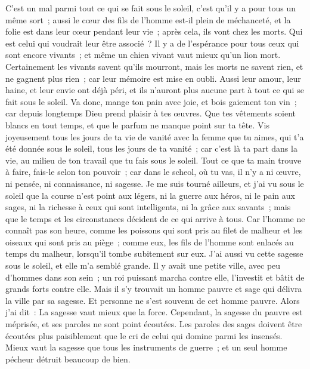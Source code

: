 \begin{multicols}{2}
C'est un mal parmi tout ce qui se fait sous le soleil, c'est qu'il y a pour tous un même sort~; aussi le cœur des fils de l'homme est-il plein de méchanceté, et la folie est dans leur cœur pendant leur vie~; après cela, ils vont chez les morts. Qui est celui qui voudrait leur être associé~?
Il y a de l'espérance pour tous ceux qui sont encore vivants~; et même un chien vivant vaut mieux qu'un lion mort.
Certainement les vivants savent qu'ils mourront, mais les morts ne savent rien, et ne gagnent plus rien~; car leur mémoire est mise en oubli. 
Aussi leur amour, leur haine, et leur envie ont déjà péri, et ils n'auront plus aucune part à tout ce qui se fait sous le soleil.
Va donc, mange ton pain avec joie, et bois gaiement ton vin~; car depuis longtemps Dieu prend plaisir à tes œuvres.
Que tes vêtements soient blancs en tout temps, et que le parfum ne manque point sur ta tête. 
Vis joyeusement tous les jours de ta vie de vanité avec la femme que tu aimes, qui t'a été donnée sous le soleil, tous les jours de ta vanité~; car c'est là ta part dans la vie, au milieu de ton travail que tu fais sous le soleil.
Tout ce que ta main trouve à faire, fais-le selon ton pouvoir~; car dans le scheol, où tu vas, il n'y a ni œuvre, ni pensée, ni connaissance, ni sagesse.
Je me suis tourné ailleurs, et j'ai vu sous le soleil que la course n'est point aux légers, ni la guerre aux héros, ni le pain aux sages, ni la richesse à ceux qui sont intelligents, ni la grâce aux savants~; mais que le temps et les circonstances décident de ce qui arrive à tous.
Car l'homme ne connaît pas son heure, comme les poissons qui sont pris au filet de malheur et les oiseaux qui sont pris au piège~; comme eux, les fils de l'homme sont enlacés au temps du malheur, lorsqu'il tombe subitement sur eux.
J'ai aussi vu cette sagesse sous le soleil, et elle m'a semblé grande.
Il y avait une petite ville, avec peu d'hommes dans son sein~; un roi puissant marcha contre elle, l'investit et bâtit de grands forts contre elle.
Mais il s'y trouvait un homme pauvre et sage qui délivra la ville par sa sagesse. Et personne ne s'est souvenu de cet homme pauvre.
Alors j'ai dit~: La sagesse vaut mieux que la force. Cependant, la sagesse du pauvre est méprisée, et ses paroles ne sont point écoutées.
Les paroles des sages doivent être écoutées plus paisiblement que le cri de celui qui domine parmi les insensés. 
Mieux vaut la sagesse que tous les instruments de guerre~; et un seul homme pécheur détruit beaucoup de bien.

\end{multicols}
